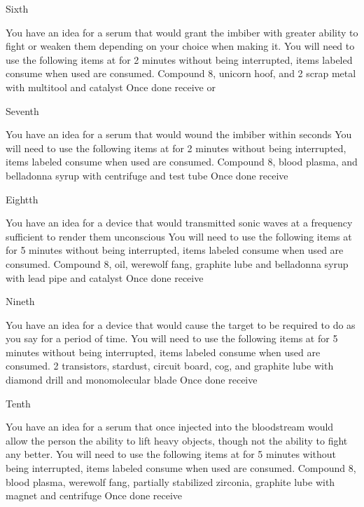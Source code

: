 \documentclass[greennotebook]{guildcamp3} %
\begin{document}
\begin{page}{Sixth}
	
	You have an idea for a serum that would grant the imbiber with greater ability to fight or weaken them depending on your choice when making it.
	You will need to use the following items at \sSciWorkbench{} for 2 minutes without being interrupted, items labeled consume when used are consumed.
	Compound 8, unicorn hoof, and 2 scrap metal with multitool and catalyst
	Once done receive \iCRUpSerum{} or \iCRDownSerum{}
	
\end{page}

\begin{page}{Seventh}
	
	You have an idea for a serum that would wound the imbiber within seconds
	You will need to use the following items at \sSciWorkbench{} for 2 minutes without being interrupted, items labeled consume when used are consumed.
	Compound 8, blood plasma, and belladonna syrup with centrifuge and test tube
	Once done receive \iTechPoison{}
	
\end{page}

\begin{page}{Eightth}
	
	You have an idea for a device that would transmitted sonic waves at a frequency sufficient to render them unconscious
	You will need to use the following items at \sSciWorkbench{} for 5 minutes without being interrupted, items labeled consume when used are consumed.
	Compound 8, oil, werewolf fang, graphite lube and belladonna syrup with lead pipe and catalyst
	Once done receive \iSonicKO{}
	
\end{page}

\begin{page}{Nineth}
	
	You have an idea for a device that would cause the target to be required to do as you say for a period of time.
	You will need to use the following items at \sSciWorkbench{} for 5 minutes without being interrupted, items labeled consume when used are consumed.
	2 transistors, stardust, circuit board, cog, and graphite lube with diamond drill and monomolecular blade
	Once done receive \iMCDevice{}
	
\end{page}

\begin{page}{Tenth}
	
	You have an idea for a serum that once injected into the bloodstream would allow the person the ability to lift heavy objects, though not the ability to fight any better.
	You will need to use the following items at \sSciWorkbench{} for 5 minutes without being interrupted, items labeled consume when used are consumed.
	Compound 8, blood plasma, werewolf fang, partially stabilized zirconia, graphite lube with magnet and centrifuge
	Once done receive \iSteroids{}
	
\end{page}
\end{document}
